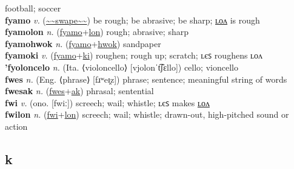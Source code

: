 football; soccer \label{'futpol} \\
\textbf{fyamo} \textit{v.} (\hyperref[swape]{\~{}\~{}swape\~{}\~{}})
be rough; be abrasive; be sharp; \hyperref[fyamolon]{ʟᴏᴧ} is rough \label{fyamo} \\
\textbf{fyamolon} \textit{n.} (\hyperref[fyamo]{fyamo}+\hyperref[lon]{lon})
rough; abrasive; sharp \label{fyamolon} \\
\textbf{fyamohwok} \textit{n.} (\hyperref[fyamo]{fyamo}+\hyperref[hwok]{hwok})
sandpaper \label{fyamohwok} \\
\textbf{fyamoki} \textit{v.} (\hyperref[fyamo]{fyamo}+\hyperref[ki]{ki})
roughen; rough up; scratch; ʟєꜱ roughens ʟᴏᴧ \label{fyamoki} \\
\textbf{'fyoloncelo} \textit{n.} (Ita. ⟨violoncello⟩ [vjolonˈt͡ʃɛllo])
cello; vioncello \label{'fyoloncelo} \\
\textbf{fwes} \textit{n.} (Eng. ⟨phrase⟩ [fɹʷeɪ̯z])
phrase; sentence; meaningful string of words \label{fwes} \\
\textbf{fwesak} \textit{n.} (\hyperref[fwes]{fwes}+\hyperref[ak]{ak})
phrasal; sentential \label{fwesak} \\
\textbf{fwi} \textit{v.} (ono. [fwiː])
screech; wail; whistle; ʟєꜱ makes \hyperref[fwilon]{ʟᴏᴧ} \label{fwi} \\
\textbf{fwilon} \textit{n.} (\hyperref[fwi]{fwi}+\hyperref[lon]{lon})
screech; wail; whistle; drawn-out, high-pitched sound or action \label{fwilon} \\
\subsection{k}

